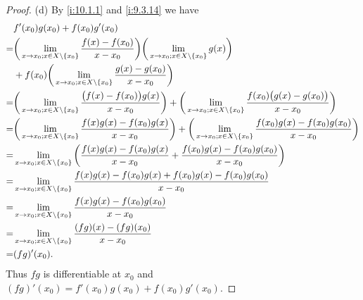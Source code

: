 \begin{proof}{(d)}
  By \cref{i:10.1.1} and \cref{i:9.3.14} we have
  \begin{align*}
      & f'(x_0) g(x_0) + f(x_0) g'(x_0)                                                                                                                                                                                       \\
    = & \bigg(\lim_{x \to x_0 ; x \in X \setminus \left\lbrace x_0\right\rbrace} \dfrac{f(x) - f(x_0)}{x - x_0}\bigg) \bigg(\lim_{x \to x_0 ; x \in X \setminus \left\lbrace x_0\right\rbrace} g(x)\bigg)                                                             \\
      & + f(x_0) \bigg(\lim_{x \to x_0 ; x \in X \setminus \left\lbrace x_0\right\rbrace} \dfrac{g(x) - g(x_0)}{x - x_0}\bigg)                                                                                                                    \\
    = & \bigg(\lim_{x \to x_0 ; x \in X \setminus \left\lbrace x_0\right\rbrace} \dfrac{\big(f(x) - f(x_0)\big) g(x)}{x - x_0}\bigg) + \bigg(\lim_{x \to x_0 ; x \in X \setminus \left\lbrace x_0\right\rbrace} \dfrac{f(x_0) \big(g(x) - g(x_0)\big)}{x - x_0}\bigg) \\
    = & \bigg(\lim_{x \to x_0 ; x \in X \setminus \left\lbrace x_0\right\rbrace} \dfrac{f(x) g(x) - f(x_0) g(x)}{x - x_0}\bigg) + \bigg(\lim_{x \to x_0 ; x \in X \setminus \left\lbrace x_0\right\rbrace} \dfrac{f(x_0) g(x) - f(x_0) g(x_0)}{x - x_0}\bigg)         \\
    = & \lim_{x \to x_0 ; x \in X \setminus \left\lbrace x_0\right\rbrace} \bigg(\dfrac{f(x) g(x) - f(x_0) g(x)}{x - x_0} + \dfrac{f(x_0) g(x) - f(x_0) g(x_0)}{x - x_0}\bigg)                                                                    \\
    = & \lim_{x \to x_0 ; x \in X \setminus \left\lbrace x_0\right\rbrace} \dfrac{f(x) g(x) - f(x_0) g(x) + f(x_0) g(x) - f(x_0) g(x_0)}{x - x_0}                                                                                                 \\
    = & \lim_{x \to x_0 ; x \in X \setminus \left\lbrace x_0\right\rbrace} \dfrac{f(x) g(x) - f(x_0) g(x_0)}{x - x_0}                                                                                                                             \\
    = & \lim_{x \to x_0 ; x \in X \setminus \left\lbrace x_0\right\rbrace} \dfrac{(fg)(x) - (fg)(x_0)}{x - x_0}                                                                                                                                   \\
    = & (fg)'(x_0).
  \end{align*}
  Thus \(fg\) is differentiable at \(x_0\) and \((fg)'(x_0) = f'(x_0) g(x_0) + f(x_0) g'(x_0)\).
\end{proof}

